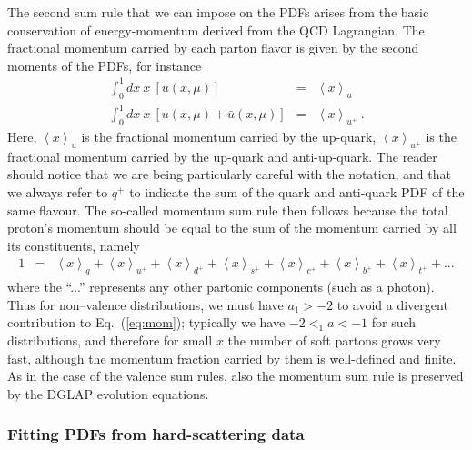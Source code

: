 The second sum rule that we can impose on the PDFs arises
from the basic conservation of energy-momentum derived from
the QCD Lagrangian.
%
The fractional momentum carried
by each parton flavor is given by the second moments of the PDFs, for instance
%
\begin{eqnarray}
\int_{0}^{1}dx\ x\ \left[u(x,\mu)\right] & = & \left\langle x\right\rangle _{u}\\
\int_{0}^{1}dx\ x\ \left[u(x,\mu)+\bar{u}(x,\mu)\right] & = & \left\langle x\right\rangle _{u^{+}}\ .
\end{eqnarray}
%
Here, $\left\langle x\right\rangle _{u}$ is the fractional momentum
carried by the up-quark, $\left\langle x\right\rangle _{u^{+}}$ is
the fractional momentum carried by the up-quark and anti-up-quark.
%
The reader should notice that we are being particularly careful
with the notation, and that we always refer to $q^+$ to indicate
the sum of the quark and anti-quark PDF of the same flavour.
%
The so-called momentum sum rule then follows because the total
proton's momentum should be equal to the sum of the momentum
carried by all its constituents, namely
\begin{eqnarray}\label{eq:mom}
1 & = & \left\langle x\right\rangle _{g}+\left\langle x\right\rangle _{u^{+}}+\left\langle x\right\rangle _{d^{+}}+\left\langle x\right\rangle _{s^{+}}+\left\langle x\right\rangle _{c^{+}}+\left\langle x\right\rangle _{b^{+}}+\left\langle x\right\rangle _{t^{+}}+...
\end{eqnarray}
%
where the ``...'' represents any other partonic components (such
as a photon). Thus for non--valence distributions, we must have $a_1>-2$ to avoid a divergent contribution to
Eq.~(\ref{eq:mom}); typically we have $-2<_1a<-1$ for such distributions, and therefore for small $x$ the number of soft partons
grows very fast, although the momentum fraction carried by them is well-defined
and finite.
%
As in the case of the valence sum rules, also the momentum
sum rule is preserved by the DGLAP evolution equations.

\subsubsection*{Fitting PDFs from hard-scattering data}

